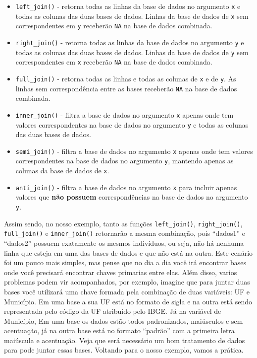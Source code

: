 \documentclass[
  letterpaper,
  DIV=11,
  numbers=noendperiod]{scrreprt}
\begin{document}
\begin{itemize}
\item
  \texttt{left\_join()} - retorna todas as linhas da base de dados no
  argumento \texttt{x} e todas as colunas das duas bases de dados.
  Linhas da base de dados de \texttt{x} sem correspondentes em
  \texttt{y} receberão \texttt{NA} na base de dados combinada.
\item
  \texttt{right\_join()} - retorna todas as linhas da base de dados no
  argumento \texttt{y} e todas as colunas das duas bases de dados.
  Linhas da base de dados de \texttt{y} sem correspondentes em
  \texttt{x} receberão \texttt{NA} na base de dados combinada.
\item
  \texttt{full\_join()} - retorna todas as linhas e todas as colunas de
  \texttt{x} e de \texttt{y}. As linhas sem correspondência entre as
  bases receberão \texttt{NA} na base de dados combinada.
\item
  \texttt{inner\_join()} - filtra a base de dados no argumento
  \texttt{x} apenas onde tem valores correspondentes na base de dados no
  argumento \texttt{y} e todas as colunas das duas bases de dados.
\item
  \texttt{semi\_join()} - filtra a base de dados no argumento \texttt{x}
  apenas onde tem valores correspondentes na base de dados no argumento
  \texttt{y}, mantendo apenas as colunas da base de dados de \texttt{x}.
\item
  \texttt{anti\_join()} - filtra a base de dados no argumento \texttt{x}
  para incluir apenas valores que \textbf{não possuem} correspondências
  na base de dados no argumento \texttt{y}.
\end{itemize}

Assim sendo, no nosso exemplo, tanto as funções \texttt{left\_join()},
\texttt{right\_join()}, \texttt{full\_join()} e \texttt{inner\_join()}
retornarão a mesma combinação, pois ``dados1'' e ``dados2'' possuem
exatamente os mesmos indivíduos, ou seja, não há nenhuma linha que
esteja em uma das bases de dados e que não está na outra. Este cenário
foi um pouco mais simples, mas pense que no dia a dia você irá encontrar
bases onde você precisará encontrar chaves primarias entre elas. Além
disso, varios problemas podem vir acompanhados, por exemplo, imagine que
para juntar duas bases você utilizará uma chave formada pela combinação
de duas variáveis: UF e Município. Em uma base a sua UF está no formato
de sigla e na outra está sendo representada pelo código da UF atribuido
pelo IBGE. Já na variável de Município, Em uma base os dados estão todos
padronizados, maiúsculos e sem acentuação, já na outra base está no
formato ``padrão'' com a primeira letra maiúscula e acentuação. Veja que
será necessário um bom tratamento de dados para pode juntar essas bases.
Voltando para o nosso exemplo, vamos a prática.
\end{document}
